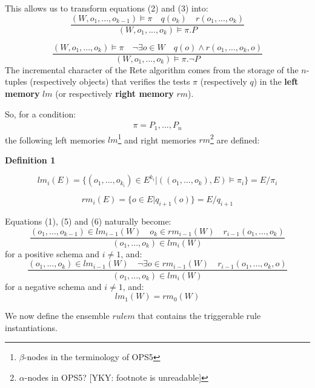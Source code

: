 This allows us to transform equations (2) and (3) into:
\begin{equation}
\frac{(W, o_1, ..., o_{k-1}) \vDash \pi \quad q(o_k) \quad r(o_1, ..., o_k) }
{(W, o_1, ..., o_k) \vDash \pi . P}
\end{equation}

\begin{equation}
\frac{(W, o_1, ..., o_{k}) \vDash \pi \quad \neg \exists o \in W \quad q(o) \wedge r(o_1, ..., o_k, o)}
{(W, o_1, ..., o_k) \vDash \pi . \neg P}
\end{equation}
The incremental character of the Rete algorithm comes from the storage of the $n$-tuples (respectively objects) that verifies the tests $\pi$ (respectively $q$) in the \textbf{left memory} $lm$ (or respectively \textbf{right memory} $rm$).

So, for a condition:
\begin{eqnarray}
\pi = P_1, ..., P_n \nonumber
\end{eqnarray}
the following left memories $lm$\footnote{$\beta$-nodes in the terminology of OPS5} and right memories $rm$\footnote{$\alpha$-nodes in OPS5? [YKY: footnote is unreadable]} are defined:

\textbf{Definition 1}

\begin{equation}
lm_i (E) = \{ (o_1, ..., o_{k_i}) \in E^{k_i} | ((o_1, ..., o_k), E ) \vDash \pi_i \} = E / \pi_i
\nonumber
\end{equation}

\begin{equation}
rm_i (E) = \{ o \in E | q_{i+1}(o) \} = E / q_{i+1}
\nonumber
\end{equation}

Equations (1), (5) and (6) naturally become:
\begin{equation}
\frac{(o_1, ..., o_{k-1}) \in lm_{i-1} (W) \quad o_k \in rm_{i-1} (W) \quad r_{i-1}(o_1, ..., o_k)}
{(o_1, ..., o_k) \in lm_i (W)}
\end{equation}
for a positive schema and $i \neq 1$, and:
\begin{equation}
\frac{(o_1, ..., o_{k}) \in lm_{i-1} (W) \quad \neg \exists o \in rm_{i-1} (W) \quad r_{i-1}(o_1, ..., o_k, o)}
{(o_1, ..., o_k) \in lm_i (W)}
\end{equation}
for a negative schema and $i \neq 1$, and:
\begin{equation}
lm_1 (W) = rm_0 (W)
\end{equation}

We now define the ensemble $rulem$ that contains the triggerable rule instantiations.

